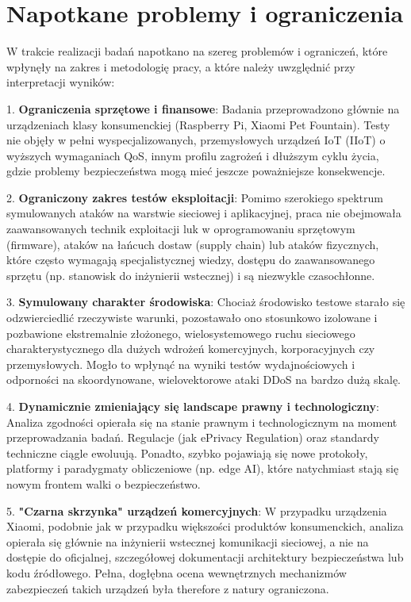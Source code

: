 \section{Napotkane problemy i ograniczenia}

W trakcie realizacji badań napotkano na szereg problemów i ograniczeń, które wpłynęły na zakres i metodologię pracy, a które należy uwzględnić przy interpretacji wyników:

1.  \textbf{Ograniczenia sprzętowe i finansowe}: Badania przeprowadzono głównie na urządzeniach klasy konsumenckiej (Raspberry Pi, Xiaomi Pet Fountain). Testy nie objęły w pełni wyspecjalizowanych, przemysłowych urządzeń IoT (IIoT) o wyższych wymaganiach QoS, innym profilu zagrożeń i dłuższym cyklu życia, gdzie problemy bezpieczeństwa mogą mieć jeszcze poważniejsze konsekwencje.

2.  \textbf{Ograniczony zakres testów eksploitacji}: Pomimo szerokiego spektrum symulowanych ataków na warstwie sieciowej i aplikacyjnej, praca nie obejmowała zaawansowanych technik exploitacji luk w oprogramowaniu sprzętowym (firmware), ataków na łańcuch dostaw (supply chain) lub ataków fizycznych, które często wymagają specjalistycznej wiedzy, dostępu do zaawansowanego sprzętu (np. stanowisk do inżynierii wstecznej) i są niezwykle czasochłonne.

3.  \textbf{Symulowany charakter środowiska}: Chociaż środowisko testowe starało się odzwierciedlić rzeczywiste warunki, pozostawało ono stosunkowo izolowane i pozbawione ekstremalnie złożonego, wielosystemowego ruchu sieciowego charakterystycznego dla dużych wdrożeń komercyjnych, korporacyjnych czy przemysłowych. Mogło to wpłynąć na wyniki testów wydajnościowych i odporności na skoordynowane, wielovektorowe ataki DDoS na bardzo dużą skalę.

4.  \textbf{Dynamicznie zmieniający się landscape prawny i technologiczny}: Analiza zgodności opierała się na stanie prawnym i technologicznym na moment przeprowadzania badań. Regulacje (jak ePrivacy Regulation) oraz standardy techniczne ciągle ewoluują. Ponadto, szybko pojawiają się nowe protokoły, platformy i paradygmaty obliczeniowe (np. edge AI), które natychmiast stają się nowym frontem walki o bezpieczeństwo.

5.  \textbf{"Czarna skrzynka" urządzeń komercyjnych}: W przypadku urządzenia Xiaomi, podobnie jak w przypadku większości produktów konsumenckich, analiza opierała się głównie na inżynierii wstecznej komunikacji sieciowej, a nie na dostępie do oficjalnej, szczegółowej dokumentacji architektury bezpieczeństwa lub kodu źródłowego. Pełna, dogłębna ocena wewnętrznych mechanizmów zabezpieczeń takich urządzeń była therefore z natury ograniczona.

